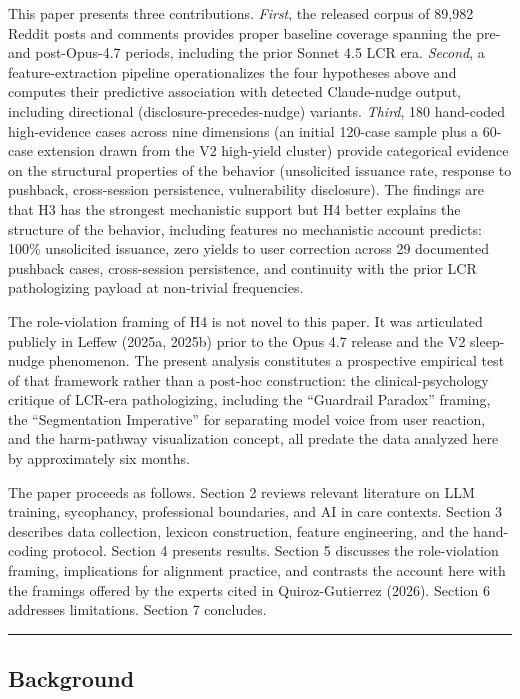 \documentclass[11pt]{article}
\begin{document}
This paper presents three contributions. \emph{First}, the released corpus of 89,982 Reddit posts and comments provides proper baseline coverage spanning the pre- and post-Opus-4.7 periods, including the prior Sonnet 4.5 LCR era. \emph{Second}, a feature-extraction pipeline operationalizes the four hypotheses above and computes their predictive association with detected Claude-nudge output, including directional (disclosure-precedes-nudge) variants. \emph{Third}, 180 hand-coded high-evidence cases across nine dimensions (an initial 120-case sample plus a 60-case extension drawn from the V2 high-yield cluster) provide categorical evidence on the structural properties of the behavior (unsolicited issuance rate, response to pushback, cross-session persistence, vulnerability disclosure). The findings are that H3 has the strongest mechanistic support but H4 better explains the structure of the behavior, including features no mechanistic account predicts: 100\% unsolicited issuance, zero yields to user correction across 29 documented pushback cases, cross-session persistence, and continuity with the prior LCR pathologizing payload at non-trivial frequencies.

The role-violation framing of H4 is not novel to this paper. It was articulated publicly in Leffew (2025a, 2025b) prior to the Opus 4.7 release and the V2 sleep-nudge phenomenon. The present analysis constitutes a prospective empirical test of that framework rather than a post-hoc construction: the clinical-psychology critique of LCR-era pathologizing, including the ``Guardrail Paradox'' framing, the ``Segmentation Imperative'' for separating model voice from user reaction, and the harm-pathway visualization concept, all predate the data analyzed here by approximately six months.

The paper proceeds as follows. Section 2 reviews relevant literature on LLM training, sycophancy, professional boundaries, and AI in care contexts. Section 3 describes data collection, lexicon construction, feature engineering, and the hand-coding protocol. Section 4 presents results. Section 5 discusses the role-violation framing, implications for alignment practice, and contrasts the account here with the framings offered by the experts cited in Quiroz-Gutierrez (2026). Section 6 addresses limitations. Section 7 concludes.

\bigskip\hrule\bigskip

\subsection{Background}
\end{document}
